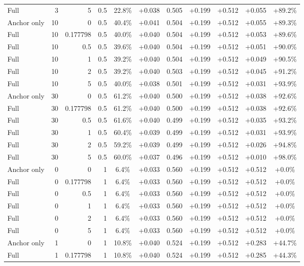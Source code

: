 \begin{table}[htbp]
\begin{tabular}{lrrrccccccc}
Full & 3 & 5 & 0.5 & 22.8\% & +0.038 & 0.505 & +0.199 & +0.512 & +0.055 & +89.2\% \\
Anchor only & 10 & 0 & 0.5 & 40.4\% & +0.041 & 0.504 & +0.199 & +0.512 & +0.055 & +89.3\% \\
Full & 10 & 0.177798 & 0.5 & 40.0\% & +0.040 & 0.504 & +0.199 & +0.512 & +0.053 & +89.6\% \\
Full & 10 & 0.5 & 0.5 & 39.6\% & +0.040 & 0.504 & +0.199 & +0.512 & +0.051 & +90.0\% \\
Full & 10 & 1 & 0.5 & 39.2\% & +0.040 & 0.504 & +0.199 & +0.512 & +0.049 & +90.5\% \\
Full & 10 & 2 & 0.5 & 39.2\% & +0.040 & 0.503 & +0.199 & +0.512 & +0.045 & +91.2\% \\
Full & 10 & 5 & 0.5 & 40.0\% & +0.038 & 0.501 & +0.199 & +0.512 & +0.031 & +93.9\% \\
Anchor only & 30 & 0 & 0.5 & 61.2\% & +0.040 & 0.500 & +0.199 & +0.512 & +0.038 & +92.6\% \\
Full & 30 & 0.177798 & 0.5 & 61.2\% & +0.040 & 0.500 & +0.199 & +0.512 & +0.038 & +92.6\% \\
Full & 30 & 0.5 & 0.5 & 61.6\% & +0.040 & 0.499 & +0.199 & +0.512 & +0.035 & +93.2\% \\
Full & 30 & 1 & 0.5 & 60.4\% & +0.039 & 0.499 & +0.199 & +0.512 & +0.031 & +93.9\% \\
Full & 30 & 2 & 0.5 & 59.2\% & +0.039 & 0.499 & +0.199 & +0.512 & +0.026 & +94.8\% \\
Full & 30 & 5 & 0.5 & 60.0\% & +0.037 & 0.496 & +0.199 & +0.512 & +0.010 & +98.0\% \\
Anchor only & 0 & 0 & 1 & 6.4\% & +0.033 & 0.560 & +0.199 & +0.512 & +0.512 & +0.0\% \\
Full & 0 & 0.177798 & 1 & 6.4\% & +0.033 & 0.560 & +0.199 & +0.512 & +0.512 & +0.0\% \\
Full & 0 & 0.5 & 1 & 6.4\% & +0.033 & 0.560 & +0.199 & +0.512 & +0.512 & +0.0\% \\
Full & 0 & 1 & 1 & 6.4\% & +0.033 & 0.560 & +0.199 & +0.512 & +0.512 & +0.0\% \\
Full & 0 & 2 & 1 & 6.4\% & +0.033 & 0.560 & +0.199 & +0.512 & +0.512 & +0.0\% \\
Full & 0 & 5 & 1 & 6.4\% & +0.033 & 0.560 & +0.199 & +0.512 & +0.512 & +0.0\% \\
Anchor only & 1 & 0 & 1 & 10.8\% & +0.040 & 0.524 & +0.199 & +0.512 & +0.283 & +44.7\% \\
Full & 1 & 0.177798 & 1 & 10.8\% & +0.040 & 0.524 & +0.199 & +0.512 & +0.285 & +44.3\% \\

\end{tabular}
\end{table}
